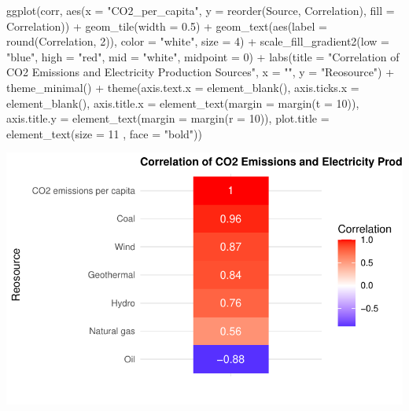 \documentclass[
  letterpaper,
  DIV=11,
  numbers=noendperiod]{scrartcl}
\newenvironment{Shaded}{\begin{snugshade}}{\end{snugshade}}
\newcommand{\AttributeTok}[1]{\textcolor[rgb]{0.40,0.45,0.13}{#1}}
\newcommand{\DecValTok}[1]{\textcolor[rgb]{0.68,0.00,0.00}{#1}}
\newcommand{\FloatTok}[1]{\textcolor[rgb]{0.68,0.00,0.00}{#1}}
\newcommand{\FunctionTok}[1]{\textcolor[rgb]{0.28,0.35,0.67}{#1}}
\newcommand{\NormalTok}[1]{\textcolor[rgb]{0.00,0.23,0.31}{#1}}
\newcommand{\SpecialCharTok}[1]{\textcolor[rgb]{0.37,0.37,0.37}{#1}}
\newcommand{\StringTok}[1]{\textcolor[rgb]{0.13,0.47,0.30}{#1}}
\begin{document}
\begin{Shaded}
\begin{Highlighting}[]
\FunctionTok{ggplot}\NormalTok{(corr, }\FunctionTok{aes}\NormalTok{(}\AttributeTok{x =} \StringTok{"CO2\_per\_capita"}\NormalTok{, }\AttributeTok{y =} \FunctionTok{reorder}\NormalTok{(Source, Correlation), }\AttributeTok{fill =}\NormalTok{ Correlation)) }\SpecialCharTok{+}
  \FunctionTok{geom\_tile}\NormalTok{(}\AttributeTok{width =} \FloatTok{0.5}\NormalTok{) }\SpecialCharTok{+}
  \FunctionTok{geom\_text}\NormalTok{(}\FunctionTok{aes}\NormalTok{(}\AttributeTok{label =} \FunctionTok{round}\NormalTok{(Correlation, }\DecValTok{2}\NormalTok{)), }\AttributeTok{color =} \StringTok{"white"}\NormalTok{, }\AttributeTok{size =} \DecValTok{4}\NormalTok{) }\SpecialCharTok{+}
  \FunctionTok{scale\_fill\_gradient2}\NormalTok{(}\AttributeTok{low =} \StringTok{"blue"}\NormalTok{, }\AttributeTok{high =} \StringTok{"red"}\NormalTok{, }\AttributeTok{mid =} \StringTok{"white"}\NormalTok{, }\AttributeTok{midpoint =} \DecValTok{0}\NormalTok{) }\SpecialCharTok{+}
  \FunctionTok{labs}\NormalTok{(}\AttributeTok{title =} \StringTok{"Correlation of CO2 Emissions and Electricity Production Sources"}\NormalTok{,}
       \AttributeTok{x =} \StringTok{""}\NormalTok{, }\AttributeTok{y =} \StringTok{"Reosource"}\NormalTok{) }\SpecialCharTok{+}
  \FunctionTok{theme\_minimal}\NormalTok{() }\SpecialCharTok{+}
  \FunctionTok{theme}\NormalTok{(}\AttributeTok{axis.text.x =} \FunctionTok{element\_blank}\NormalTok{(),}
        \AttributeTok{axis.ticks.x =} \FunctionTok{element\_blank}\NormalTok{(),}
        \AttributeTok{axis.title.x =} \FunctionTok{element\_text}\NormalTok{(}\AttributeTok{margin =} \FunctionTok{margin}\NormalTok{(}\AttributeTok{t =} \DecValTok{10}\NormalTok{)), }
        \AttributeTok{axis.title.y =} \FunctionTok{element\_text}\NormalTok{(}\AttributeTok{margin =} \FunctionTok{margin}\NormalTok{(}\AttributeTok{r =} \DecValTok{10}\NormalTok{)),}
        \AttributeTok{plot.title =} \FunctionTok{element\_text}\NormalTok{(}\AttributeTok{size =} \DecValTok{11}
\NormalTok{                                  , }\AttributeTok{face =} \StringTok{"bold"}\NormalTok{))}
\end{Highlighting}
\end{Shaded}

\includegraphics{project_files/figure-pdf/unnamed-chunk-23-1.pdf}
\end{document}
